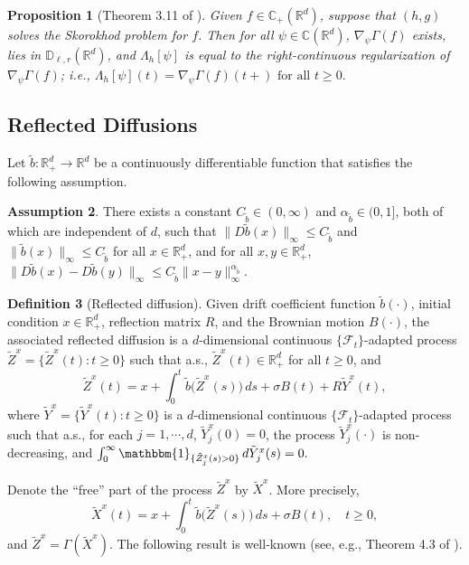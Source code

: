 \documentclass[11pt]{article}
\theoremstyle{definition}
\newtheorem{assumption}{Assumption}[section]
\newtheorem{definition}[assumption]{Definition}
\theoremstyle{plain}
\newtheorem{proposition}[assumption]{Proposition}
\newcommand{\R}{\mathbb{R}}
\newcommand{\C}{\mathbb{C}}
\newcommand{\D}{\mathbb{D}}
\newcommand{\tb}{\tilde{b}}
\begin{document}
\begin{proposition}[Theorem 3.11 of \cite{LipshutzRamanan2018}]\label{prop:LR2018-main}
Given \( f \in \C_+(\R^d) \), suppose that \( (h,g) \) solves the Skorokhod problem for \( f \).  
Then for all \( \psi \in \C(\R^d) \), \( \nabla_\psi \Gamma(f) \) exists, lies in \( \D_{\ell, r}(\mathbb{R}^d) \),  
and \( \Lambda_h[\psi] \) is equal to the right-continuous regularization of \( \nabla_\psi \Gamma(f) \); i.e.,
\(
\Lambda_h[\psi](t) = \nabla_\psi \Gamma(f)(t+) \text{ for all } t \ge 0.
\)
\end{proposition}

\subsection{Reflected Diffusions}\label{ssec:ref-dif}

Let $\tilde{b}: \mathbb{R}_+^d \to \mathbb{R}^d$ be a continuously differentiable function that satisfies the following assumption.

\begin{assumption}\label{as:tb}
There exists a constant $C_{\tilde{b}} \in (0, \infty)$ and $\alpha_{\tb} \in (0,1]$, both of which are independent of $d$, such that
$\| D\tb(x) \|_\infty \le C_{\tb}$ and 
$\| \tb(x) \|_\infty \le C_{\tb}$ for all $x \in \mathbb{R}_+^d$, 
and for all $x, y \in \R_+^d$, %
\(
\| D\tb(x) - D\tb(y) \|_\infty \le C_{\tilde{b}} \|x - y\|^{\alpha_{\tb}}_\infty.
\)

\end{assumption}

\begin{definition}[Reflected diffusion]
Given drift coefficient function $\tb(\cdot)$, initial condition $x \in \mathbb{R}_+^d$, reflection matrix $R$, and the Brownian motion $B(\cdot)$, 
the associated reflected diffusion is a $d$-dimensional continuous $\{\mathcal{F}_t\}$-adapted process $\tilde Z^x = \{\tilde Z^x(t) : t \ge 0\}$ such that a.s.,
\( \tilde Z^x(t) \in \mathbb{R}_+^d \) for all $t \ge 0$,
and
\begin{equation}\label{eq:reflected-diffusion}
\tilde Z^x(t) = x + \int_0^t \tb\bigl( \tilde Z^x(s) \bigr)\,ds + \sigma B(t) + R \tilde Y^x(t),
\end{equation}
where $\tilde Y^x = \{\tilde Y^x(t): t \ge 0\}$ is a $d$-dimensional continuous $\{\mathcal{F}_t\}$-adapted process such that a.s., for each $j = 1, \cdots, d$,
$\tilde Y_j^x(0) = 0$, the process $\tilde Y_j^x(\cdot)$ is non-decreasing, and 
\(
\int_0^\infty \mathbbm{1}_{\{\tilde Z_j^x(s) > 0\}}\,d\tilde Y_j^x(s) = 0.
\)
\end{definition}
Denote the ``free'' part of the process $\tilde Z^x$ by $\tilde X^x$. More precisely, 
\begin{equation}\label{eq:tx}
\tilde X^x(t) = x + \int_0^t \tb\bigl( \tilde Z^x(s) \bigr)\,ds + \sigma B(t), \quad t \geq 0, 
\end{equation}
and $\tilde Z^x = \Gamma \left(\tilde X^x\right)$.
The following result is well-known (see, e.g., Theorem 4.3 of \cite{REF}).
\end{document}
